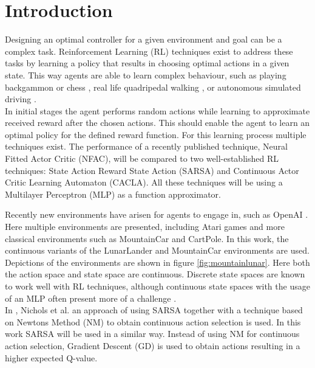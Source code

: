 
\section{Introduction}

Designing an optimal controller for a given environment and goal can be a complex task. Reinforcement Learning (RL) techniques exist to address these tasks by learning a policy that results in choosing optimal actions in a given state. This way agents are able to learn complex behaviour, such as playing backgammon \cite{tesauro2002programming} or chess \cite{baxter1999knightcap},
real life quadripedal walking \cite{kohl2004policy}, or autonomous simulated driving \cite{}. \\  %

In initial stages the agent performs random actions while learning to approximate received reward after the chosen actions. This should enable the agent to learn an optimal policy for the defined reward function. For this learning process multiple techniques exist. The performance of a recently published technique, Neural Fitted Actor Critic (NFAC), will be compared to two well-established RL techniques: State Action Reward State Action (SARSA) and Continuous Actor Critic Learning Automaton (CACLA). All these techniques will be using a Multilayer Perceptron (MLP) as a function approximator.

Recently new environments have arisen for agents to engage in, such as OpenAI \cite{openaigym}. Here multiple environments are presented, including Atari games and more classical environments such as MountainCar and CartPole. In this work, the continuous variants of the LunarLander and MountainCar environments are used. Depictions of the environments are shown in figure \ref{fig:mountainlunar}. Here both the action space and state space are continuous.  Discrete state spaces are known to work well with RL techniques, although continuous state spaces with the usage of an MLP often present more of a challenge \cite{cetina2008multilayer}. \\
In \cite{nichols2015continuous}, Nichols et al. an approach of using SARSA together with a technique based on Newtons Method (NM) to obtain continuous action selection is used. In this work SARSA will be used in a similar way. Instead of using NM for continuous action selection, Gradient Descent (GD) is used to obtain actions resulting in a higher expected Q-value.

